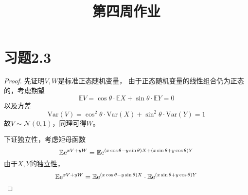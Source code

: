 \documentclass[cn]{homework}
\title{第四周作业}
\newcommand{\E}{\mathbb E}
\newcommand{\var}{\mathrm{Var}}
\begin{document}
    \maketitle

    \section{习题2.3}
    \begin{proof}
        先证明$V,W$是标准正态随机变量，
        由于正态随机变量的线性组合仍为正态的，考虑期望
        \[\E V=\cos\theta\cdot\E X+\sin\theta\cdot\E Y=0\]
        以及方差
        \[\var(V)=\cos^2\theta\cdot\var(X)+\sin^2\theta\cdot\var(Y)=1\]
        故$V\sim\mathcal N(0,1)$，同理可得$W$。

        下证独立性，考虑矩母函数
        \[\E\e^{xV+yW}=\E\e^{(x\cos\theta-y\sin\theta)X
                          +(x\sin\theta+y\cos\theta)Y}\]
        由于$X,Y$的独立性，
        \[\E\e^{xV+yW}=\E\e^{(x\cos\theta-y\sin\theta)X}
                          \cdot\E\e^{(x\sin\theta+y\cos\theta)Y}\]
    \end{proof}
\end{document}
